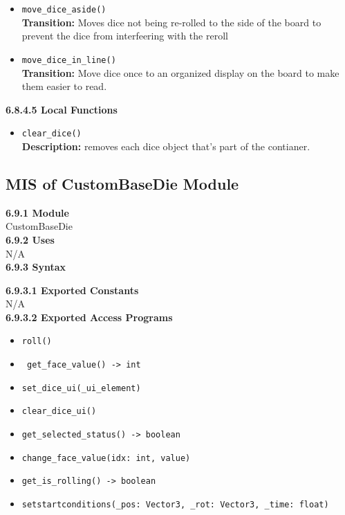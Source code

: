 \documentclass[12pt, titlepage]{article}
\begin{document}
\begin{itemize}
	\item \texttt{move\_dice\_aside() }\\
	\textbf{Transition:} Moves dice not being re-rolled to the side of the board to prevent the dice from interfeering with the reroll
	
	\item \texttt{move\_dice\_in\_line() }\\
	\textbf{Transition:} Move dice once to an organized display on the board to make them easier to read. 

	


\end{itemize}

\textbf{6.8.4.5 Local Functions}

\begin{itemize}
	
	\item \texttt{clear\_dice() }\\
	\textbf{Description:} removes each dice object that's part of the contianer. 
	
\end{itemize}


\subsection{MIS of CustomBaseDie Module}
\textbf{6.9.1 Module}\\
 CustomBaseDie\\

\noindent \textbf{6.9.2 Uses}\\
N/A \\

\noindent \textbf{6.9.3 Syntax}

\noindent \textbf{6.9.3.1 Exported Constants}\\
N/A\\

\textbf{6.9.3.2 Exported Access Programs}
\begin{itemize}
	\item \texttt{roll() }
	\item \texttt{ get\_face\_value() -> int }
	\item \texttt{set\_dice\_ui(\_ui\_element) }
	\item \texttt{clear\_dice\_ui() }
	\item \texttt{get\_selected\_status() -> boolean}
	\item \texttt{change\_face\_value(idx: int, value) }
	\item \texttt{get\_is\_rolling() -> boolean }
	\item \texttt{setstartconditions(\_pos: Vector3, \_rot: Vector3, \_time: float) }
	
	
\end{itemize}
\end{document}
